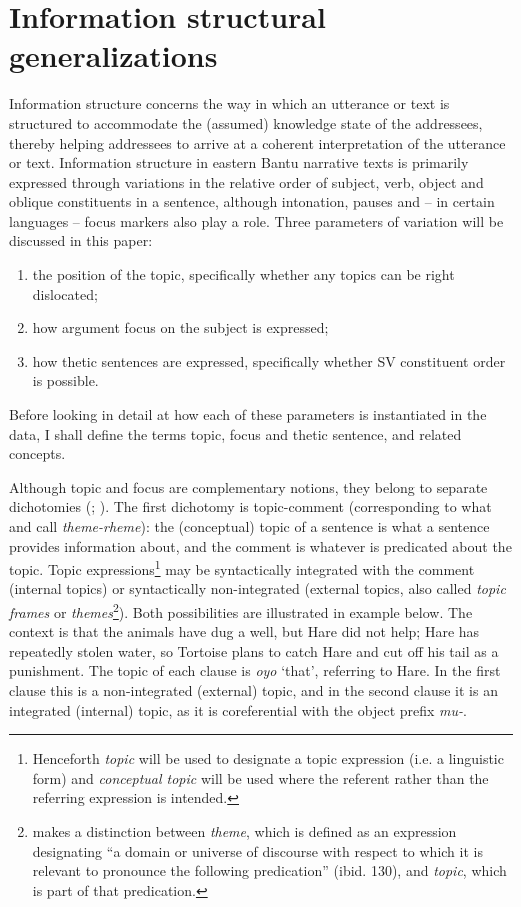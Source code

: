 \documentclass[output=paper]{langsci/langscibook}
\begin{document}
\section{Information structural generalizations}\label{§2:information.nicolle}

Information structure concerns the way in which an utterance or text is structured to accommodate the (assumed) knowledge state of the addressees, thereby helping addressees to arrive at a coherent interpretation of the utterance or text. Information structure in eastern Bantu narrative texts is primarily expressed through variations in the relative order of subject, verb, object and oblique constituents in a sentence, although intonation, pauses and -- in certain languages -- focus markers also play a role. Three parameters of variation will be discussed in this paper:

\begin{enumerate}
\item the position of the topic, specifically whether any topics can be right dislocated;
\item how argument focus on the subject is expressed;
\item how thetic sentences are expressed, specifically whether SV constituent order is possible.
\end{enumerate}

Before looking in detail at how each of these parameters is instantiated in the data, I shall define the terms topic, focus and thetic sentence, and related concepts.

Although topic and focus are complementary notions, they belong to separate dichotomies (\citealt[66]{decat2007}; \citealt[42]{erteschikshir2007}). The first dichotomy is topic-comment (corresponding to what \citet{halliday1967} and \citet{dik1981,dik1989} call \textit{theme-rheme}): the (conceptual) topic of a sentence is what a sentence provides information about, and the comment is whatever is predicated about the topic. Topic expressions\footnote{Henceforth \textit{topic} will be used to designate a topic expression (i.e. a linguistic form) and \textit{conceptual topic} will be used where the referent rather than the referring expression is intended.} may be syntactically integrated with the comment (internal topics) or syntactically non-integrated (external topics, also called \textit{topic frames} or \textit{themes}\footnote{\citet[129--144]{dik1981} makes a distinction between \textit{theme}, which is defined as an expression designating “a domain or universe of discourse with respect to which it is relevant to pronounce the following predication” (ibid. 130), and \textit{topic}, which is part of that predication.}). Both possibilities are illustrated in example  below. The context is that the animals have dug a well, but Hare did not help; Hare has repeatedly stolen water, so Tortoise plans to catch Hare and cut off his tail as a punishment. The topic of each clause is  \textit{oyo} ‘that’, referring to Hare. In the first clause this is a non-integrated (external) topic, and in the second clause it is an integrated (internal) topic, as it is coreferential with the object prefix \textit{mu-}.
\end{document}

